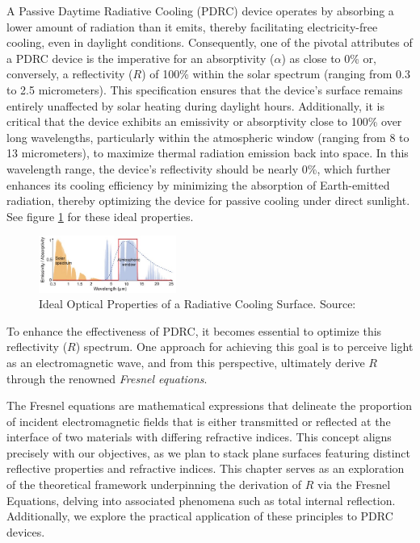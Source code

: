A Passive Daytime Radiative Cooling (PDRC) device operates by absorbing a lower amount of radiation than it emits, thereby facilitating electricity-free cooling, even in daylight conditions. Consequently, one of the pivotal attributes of a PDRC device is the imperative for an absorptivity ($\alpha$) as close to 0\% or, conversely, a reflectivity ($R$) of 100\% within the solar spectrum (ranging from 0.3 to 2.5 micrometers). This specification ensures that the device's surface remains entirely unaffected by solar heating during daylight hours. Additionally, it is critical that the device exhibits an emissivity or absorptivity close to 100\% over long wavelengths, particularly within the atmospheric window (ranging from 8 to 13 micrometers), to maximize thermal radiation emission back into space. In this wavelength range, the device's reflectivity should be nearly 0\%, which further enhances its cooling efficiency by minimizing the absorption of Earth-emitted radiation, thereby optimizing the device for passive cooling under direct sunlight. See figure \ref{fig:ideal_PDRC_properties_copy} for these ideal properties.

\begin{figure}[ht!]
  \centering
  \includegraphics[width=0.4\textwidth]{Chapters/Figures/Chapter 2 Figures/Ideal Optical Properties of a Radiative Cooling Surface copy.jpg}
  \caption[Ideal Optical Properties of a Radiative Cooling Surface]{Ideal Optical Properties of a Radiative Cooling Surface. Source: \cite{yang_passive_2020}}
  \label{fig:ideal_PDRC_properties_copy}
\end{figure}

To enhance the effectiveness of PDRC, it becomes essential to optimize this reflectivity ($R$) spectrum. One approach for achieving this goal is to perceive light as an electromagnetic wave, and from this perspective, ultimately derive $R$ through the renowned \textit{Fresnel equations}.

The Fresnel equations are mathematical expressions that delineate the proportion of incident electromagnetic fields that is either transmitted or reflected at the interface of two materials with differing refractive indices. This concept aligns precisely with our objectives, as we plan to stack plane surfaces featuring distinct reflective properties and refractive indices. This chapter serves as an exploration of the theoretical framework underpinning the derivation of $R$ via the Fresnel Equations, delving into associated phenomena such as total internal reflection. Additionally, we explore the practical application of these principles to PDRC devices.

